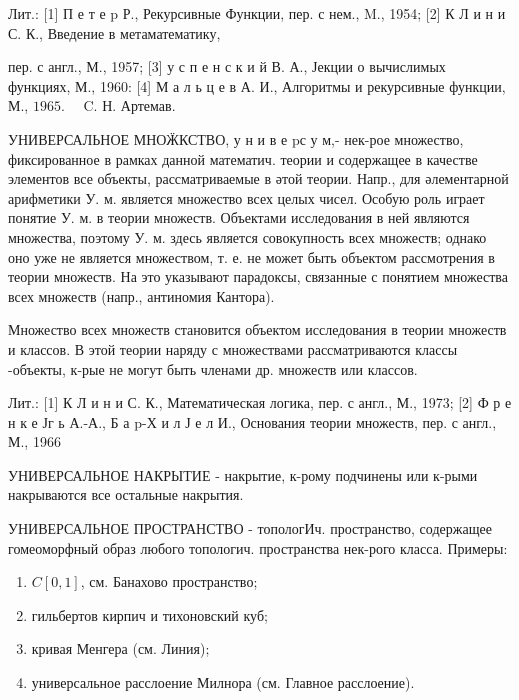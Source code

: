 \documentclass[10pt]{article}
\begin{document}
Лит.: [1] П е т е p Р., Рекурсивные Функции, пер. с нем., M., 1954; [2] К Л и н и С. К., Введение в метаматематику,

пер. с англ., М., 1957; [3] у с п е н с к и й В. А., Јекции о вычислимых функциях, М., 1960: [4] М а л ь ц е в А. И., Алгоритмы и рекурсивные функции, М., $1965 . \quad$ C. Н. Артемав.



УНИВЕРСАЛЬНОЕ МНОӜКСТВО, у н и в е pс у м,- нек-рое множество, фиксированное в рамках данной математич. теории и содержащее в качестве элементов все объекты, рассматриваемые в әтой теории. Напр., для әлементарной арифметики У. м. является множество всех целых чисел. Особую роль играет понятие У. м. в теории множеств. Объектами исследования в ней являются множества, поэтому У. м. здесь является совокупность всех множеств; однако оно уже не является множеством, т. е. не может быть объектом рассмотрения в теории множеств. На это указывают парадоксы, связанные с понятием множества всех множеств (напр., антиномия Кантора).



Множество всех множеств становится объектом исследования в теории множеств и классов. В этой теории наряду с множествами рассматриваются классы -объекты, к-рые не могут быть членами др. множеств или классов.



Лит.: [1] К Л и н и С. К., Математическая логика, пер. с англ., М., 1973; [2] Ф р е н к е Јг ь А.-А., Б а p-Х и л Ј е л И., Основания теории множеств, пер. с англ., М., 1966



УНИВЕРСАЛЬНОЕ НАКРЫТИЕ - накрытие, к-рому подчинены или к-рыми накрываются все остальные накрытия.



УНИВЕРСАЛЬНОЕ ПРОСТРАНСТВО - топологИч. пространство, содержащее гомеоморфный образ любого топологич. пространства нек-рого класса. Примеры:



\begin{enumerate}

  \item $C[0,1]$, см. Банахово пространство;



  \item гильбертов кирпич и тихоновский куб;



  \item кривая Менгера (см. Линия);



  \item универсальное расслоение Милнора (см. Главное расслоение).



\end{enumerate}
\end{document}
